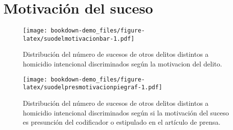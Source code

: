 \documentclass[
]{book}
\begin{document}
\hypertarget{motivaciuxf3n-del-suceso}{%
\section{Motivación del suceso}\label{motivaciuxf3n-del-suceso}}



\begin{figure}
\centering
\texttt{[image: bookdown-demo\_files/figure-latex/suodelmotivacionbar-1.pdf]}
\caption{\label{fig:suodelmotivacionbar}Distribución del número de sucesos de otros delitos distintos a homicidio intencional discriminados según la motivacion del delito.}
\end{figure}



\begin{figure}
\centering
\texttt{[image: bookdown-demo\_files/figure-latex/suodelpresmotivacionpiegraf-1.pdf]}
\caption{\label{fig:suodelpresmotivacionpiegraf}Distribución del número de sucesos de otros delitos distintos a homicidio intencional discriminados según si la motivación del suceso es presunción del codificador o estipulado en el artículo de prensa.}
\end{figure}

  
\end{document}
